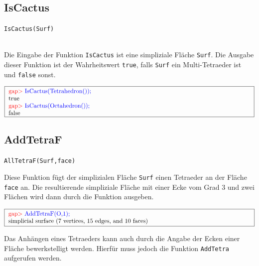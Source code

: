 \documentclass[12pt,titlepage,twoside,cleardoublepage]{article}
\theoremstyle{nummermitklammern}
\numberwithin{equation}{section}
\begin{document}
\subsection{IsCactus}
\begin{large}
\texttt{IsCactus(Surf)}
\end{large}\\
Die Eingabe der Funktion \texttt{IsCactus} ist eine simpliziale Fläche \texttt{Surf}. Die Ausgabe dieser Funktion ist der Wahrheitswert \texttt{true}, falls \texttt{Surf} ein Multi-Tetraeder ist und \texttt{false} sonst. 
\begin{center}
$\fbox{
\parbox{14cm}{
\textcolor{red}{gap$>$} \textcolor{blue}{IsCactus(Tetrahedron());}\newline
true\newline
\textcolor{red}{gap$>$} \textcolor{blue}{IsCactus(Octahedron());}\newline
false
}
}$


\end{center}

\subsection{AddTetraF}
\begin{large}
\texttt{AllTetraF(Surf,face)}
\end{large}
Diese Funktion fügt der  simplizialen Fläche \texttt{Surf} einen Tetraeder an der Fläche \texttt{face} an. Die resultierende simpliziale Fläche mit einer Ecke vom Grad 3 und zwei Flächen wird dann durch die Funktion ausgeben.
\begin{center}
$\fbox{
\parbox{14cm}{
\textcolor{red}{gap$>$} \textcolor{blue}{AddTetraF(O,1);}\newline
simplicial surface (7 vertices, 15 edges, and 10 faces)
}
}$
\end{center}
Das Anhängen eines Tetraeders kann auch durch die Angabe der Ecken einer Fläche bewerkstelligt werden. Hierfür muss jedoch die Funktion \texttt{AddTetra} aufgerufen werden.
\end{document}
